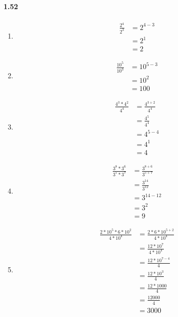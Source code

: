 \documentclass{article}
\newcommand\litem[1]{\item{\bfseries#1\space}}
\begin{document}
\paragraph{1.52}
\begin{enumerate}[label=\emph{\alph*})]
\litem{
\begin{align*}
  \frac{2^4}{2^3} &= 2^{4-3} \\
  &= 2^1 \\
  &= 2
\end{align*}
}
\litem{
\begin{align*}
  \frac{10^5}{10^3} &= 10^{5-3} \\
  &= 10^2 \\
  &= 100
\end{align*}
}
\litem{
\begin{align*}
  \frac{4^3 * 4^2}{4^4} &= \frac{4^{3+2}}{4^4} \\
  &= \frac{4^5}{4^4} \\
  &= 4^{5-4} \\
  &= 4^1 \\
  &= 4
\end{align*}
}
\litem{
\begin{align*}
  \frac{3^8 * 3^6}{3^5 * 3^7} &= \frac{3^{8+6}}{3^{5+7}} \\
  &= \frac{3^14}{3^12} \\
  &= 3^{14-12} \\
  &= 3^2 \\
  &= 9
\end{align*}
}
\litem{
\begin{align*}
  \frac{2 * 10^5 * 6 * 10^2}{4 * 10^4} &= \frac{2 * 6 * 10^{5+2}}{4 * 10^4} \\
  &= \frac{12 * 10^7}{4 * 10^4} \\
  &= \frac{12 * 10^{7-4}}{4} \\
  &= \frac{12 * 10^3}{4} \\ 
  &= \frac{12 * 1000}{4} \\
  &= \frac{12000}{4} \\
  &= 3000
\end{align*}
}
\end{enumerate}
\end{document}
